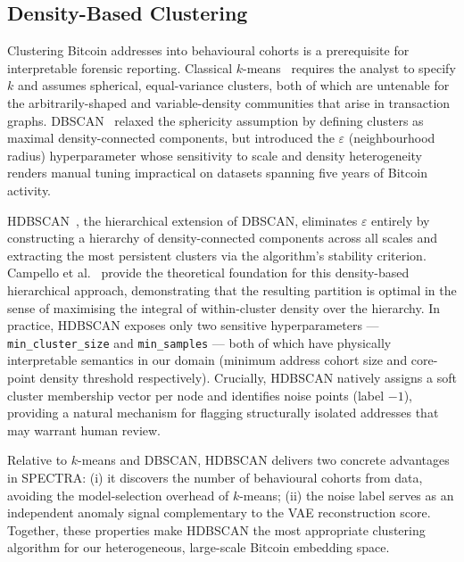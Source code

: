 \subsection{Density-Based Clustering}
\label{subsec:clustering}

Clustering Bitcoin addresses into behavioural cohorts is a prerequisite for
interpretable forensic reporting.  Classical $k$-means~\cite{Lloyd1982}
requires the analyst to specify $k$ and assumes spherical, equal-variance
clusters, both of which are untenable for the arbitrarily-shaped and variable-density
communities that arise in transaction graphs.  DBSCAN~\cite{Ester1996}
relaxed the sphericity assumption by defining clusters as maximal
density-connected components, but introduced the $\varepsilon$ (neighbourhood
radius) hyperparameter whose sensitivity to scale and density heterogeneity
renders manual tuning impractical on datasets spanning five years of Bitcoin
activity.

HDBSCAN~\cite{McInnes2017}, the hierarchical extension of DBSCAN, eliminates
$\varepsilon$ entirely by constructing a hierarchy of density-connected
components across all scales and extracting the most persistent clusters via the
algorithm's stability criterion.  Campello et al.~\cite{Campello2013} provide
the theoretical foundation for this density-based hierarchical approach,
demonstrating that the resulting partition is optimal in the sense of maximising
the integral of within-cluster density over the hierarchy.  In practice,
HDBSCAN exposes only two sensitive hyperparameters --- \texttt{min\_cluster\_size}
and \texttt{min\_samples} --- both of which have physically interpretable
semantics in our domain (minimum address cohort size and core-point density
threshold respectively).  Crucially, HDBSCAN natively assigns a soft cluster
membership vector per node and identifies noise points (label $-1$), providing
a natural mechanism for flagging structurally isolated addresses that may
warrant human review.

Relative to $k$-means and DBSCAN, HDBSCAN delivers two concrete advantages in
SPECTRA: (i) it discovers the number of behavioural cohorts from data, avoiding
the model-selection overhead of $k$-means; (ii) the noise label serves as an
independent anomaly signal complementary to the VAE reconstruction score.
Together, these properties make HDBSCAN the most appropriate clustering
algorithm for our heterogeneous, large-scale Bitcoin embedding space.

